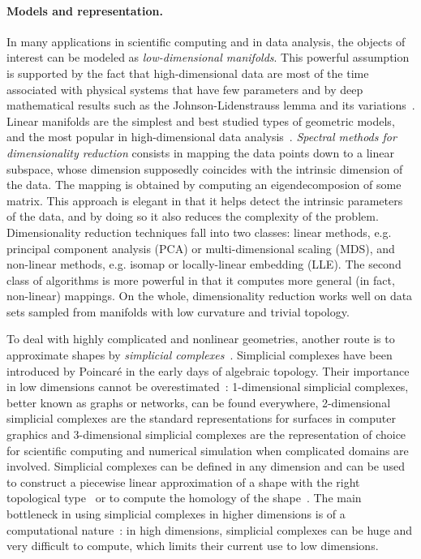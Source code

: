 \paragraph{Models and representation.} 
In  many applications in scientific computing and in data analysis,  the objects of
interest can be modeled as {\em low-dimensional manifolds}. This powerful assumption is supported by the fact that high-dimensional data are most of the time associated with physical systems that have few parameters and by deep mathematical results such as the Johnson-Lidenstrauss lemma and its variations~\cite{}.  Linear manifolds are the simplest and best studied types of geometric models, and the most popular in high-dimensional data analysis~\cite{hs-fmmds-2006,lv-nldr-2007}. {\em Spectral methods for dimensionality reduction} consists in mapping the data points down to a linear subspace, whose dimension supposedly coincides with the intrinsic dimension of the data. The mapping is obtained by computing an eigendecomposion of some matrix. This approach is elegant in that it helps detect the intrinsic parameters of the data, and by doing so it also reduces the complexity of the problem. Dimensionality reduction techniques fall into two classes: linear methods, e.g. principal component analysis (PCA) or multi-dimensional scaling (MDS), and non-linear methods, e.g. isomap or locally-linear embedding (LLE). The second class of algorithms is more powerful in that it computes more general (in fact, non-linear) mappings. On the whole, dimensionality reduction works well on data sets sampled from manifolds with low curvature and trivial topology. %

 To deal with highly complicated and nonlinear geometries, another route is to approximate shapes by {\em simplicial complexes}~\cite{hh-ct-2010}.  Simplicial complexes have been introduced by Poincar\'e in the early days of algebraic topology. Their importance in low dimensions cannot be overestimated~: 1-dimensional simplicial complexes, better known as graphs or networks, can be found everywhere,  2-dimensional simplicial complexes are the standard representations for surfaces in computer graphics and 3-dimensional simplicial complexes are the representation of choice for scientific computing and numerical simulation when complicated domains are involved. Simplicial complexes can be defined in any dimension and can be used to construct a piecewise linear approximation of a shape with the right topological type~\cite{geometrica-7142i} or to 
compute the homology of the shape~\cite{hh-ct-2010}. 
The main bottleneck in using simplicial complexes in higher dimensions is of a computational nature~:  in high dimensions, simplicial complexes can be huge and very difficult to compute, which limits their current use to low dimensions.


